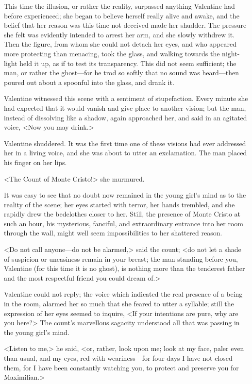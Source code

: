  This time the illusion, or rather the reality, surpassed anything Valentine had before experienced; she began to believe herself really alive and awake, and the belief that her reason was this time not deceived made her shudder. The pressure she felt was evidently intended to arrest her arm, and she slowly withdrew it. Then the figure, from whom she could not detach her eyes, and who appeared more protecting than menacing, took the glass, and walking towards the night-light held it up, as if to test its transparency. This did not seem sufficient; the man, or rather the ghost—for he trod so softly that no sound was heard—then poured out about a spoonful into the glass, and drank it. 

 Valentine witnessed this scene with a sentiment of stupefaction. Every minute she had expected that it would vanish and give place to another vision; but the man, instead of dissolving like a shadow, again approached her, and said in an agitated voice, <Now you may drink.> 

 Valentine shuddered. It was the first time one of these visions had ever addressed her in a living voice, and she was about to utter an exclamation. The man placed his finger on her lips. 

 <The Count of Monte Cristo!> she murmured. 

 It was easy to see that no doubt now remained in the young girl's mind as to the reality of the scene; her eyes started with terror, her hands trembled, and she rapidly drew the bedclothes closer to her. Still, the presence of Monte Cristo at such an hour, his mysterious, fanciful, and extraordinary entrance into her room through the wall, might well seem impossibilities to her shattered reason. 

 <Do not call anyone—do not be alarmed,> said the count; <do not let a shade of suspicion or uneasiness remain in your breast; the man standing before you, Valentine (for this time it is no ghost), is nothing more than the tenderest father and the most respectful friend you could dream of.> 

 Valentine could not reply; the voice which indicated the real presence of a being in the room, alarmed her so much that she feared to utter a syllable; still the expression of her eyes seemed to inquire, <If your intentions are pure, why are you here?> The count's marvellous sagacity understood all that was passing in the young girl's mind. 

 <Listen to me,> he said, <or, rather, look upon me; look at my face, paler even than usual, and my eyes, red with weariness—for four days I have not closed them, for I have been constantly watching you, to protect and preserve you for Maximilian.> 

